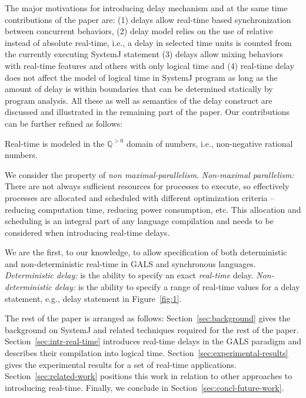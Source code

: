 The major motivations for introducing delay mechanism and at the same
time contributions of the paper are: (1) delays allow real-time based
synchronization between concurrent behaviors, (2) delay model relies on
the use of relative instead of absolute real-time, i.e., a delay in
selected time units is counted from the currently executing SystemJ
statement (3) delays allow mixing behaviors with real-time features and
others with only logical time and (4) real-time delay does not affect
the model of logical time in SystemJ program as long as the amount of
delay is within boundaries that can be determined statically by program
analysis. All these as well as semantics of the delay construct are
discussed and illustrated in the remaining part of the paper. Our
contributions can be further refined as follows:
\begin{enumerate*}
\item Real-time is modeled in the $\mathbb{Q}^{>0}$ domain of numbers,
 i.e., non-negative rational numbers.
\item We consider the property of \textit{non
    maximal-parallelism}. \textit{Non-maximal parallelism:} There are
  not always sufficient resources for processes to execute, so
  effectively processes are allocated and scheduled with different
  optimization criteria -- reducing computation time, reducing power
  consumption, etc. This allocation and scheduling is an integral part
  of any language compilation and needs to be considered when
  introducing real-time delays.
\item We are the first, to our knowledge, to allow specification of both
  deterministic and non-deterministic real-time in GALS and synchronous
  languages. \textit{Deterministic delay:} is the ability to specify an
  exact \textit{real-time} delay. \textit{Non-deterministic delay:} is
  the ability to specify a range of real-time values for a delay
  statement, e.g., delay statement in Figure~\ref{fig:1}.
\end{enumerate*}

The rest of the paper is arranged as follows:
Section~\ref{sec:background} gives the background on SystemJ and related
techniques required for the rest of the
paper. Section~\ref{sec:intr-real-time} introduces real-time delays in
the GALS paradigm and describes their compilation into logical
time. Section~\ref{sec:experimental-results} gives the experimental
results for a set of real-time
applications. Section~\ref{sec:related-work} positions this work in
relation to other approaches to introducing real-time. Finally, we
conclude in Section~\ref{sec:concl-future-work}.


